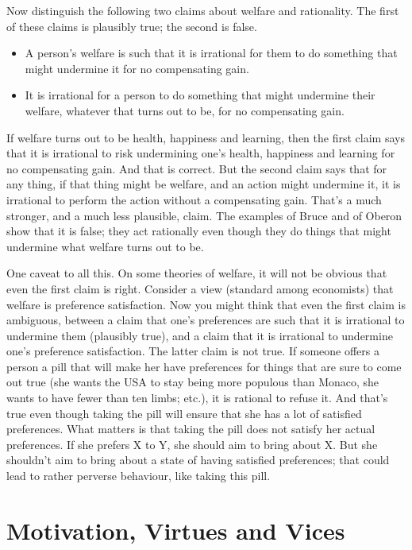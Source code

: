 Now distinguish the following two claims about welfare and rationality. The first of these claims is plausibly true; the second is false.

\begin{itemize}
\item{} A person's welfare is such that it is irrational for them to do something that might undermine it for no compensating gain.

\item{} It is irrational for a person to do something that might undermine their welfare, whatever that turns out to be, for no compensating gain.

\end{itemize}
If welfare turns out to be health, happiness and learning, then the first claim says that it is irrational to risk undermining one's health, happiness and learning for no compensating gain. And that is correct. But the second claim says that for any thing, if that thing might be welfare, and an action might undermine it, it is irrational to perform the action without a compensating gain. That's a much stronger, and a much less plausible, claim. The examples of \gls{Bruce} and of \gls{Oberon} show that it is false; they act rationally even though they do things that might undermine what welfare turns out to be.

One caveat to all this. On some theories of welfare, it will not be obvious that even the first claim is right. Consider a view (standard among economists) that welfare is preference satisfaction. Now you might think that even the first claim is ambiguous, between a claim that one's preferences are such that it is irrational to undermine them (plausibly true), and a claim that it is irrational to undermine one's preference satisfaction. The latter claim is not true. If someone offers a person a pill that will make her have preferences for things that are sure to come out true (she wants the USA to stay being more populous than Monaco, she wants to have fewer than ten limbs; etc.), it is rational to refuse it. And that's true even though taking the pill will ensure that she has a lot of satisfied preferences. What matters is that taking the pill does not satisfy her actual preferences. If she prefers X to Y, she should aim to bring about X. But she shouldn't aim to bring about a state of having satisfied preferences; that could lead to rather perverse behaviour, like taking this pill.

\section{Motivation, Virtues and Vices}
\label{motivationvirtuesandvices}

